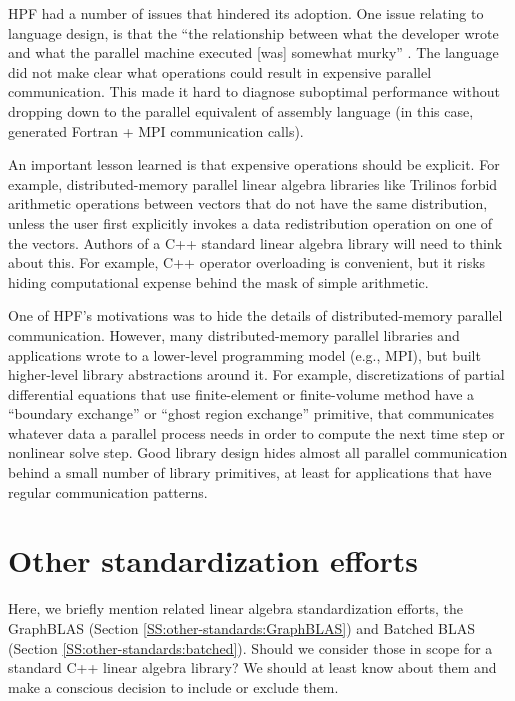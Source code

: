 HPF had a number of issues that hindered its adoption.  One issue
relating to language design, is that the ``the relationship between
what the developer wrote and what the parallel machine executed [was]
somewhat murky'' \cite[p. 13]{Kennedy2007}.  The language did not make
clear what operations could result in expensive parallel
communication.  This made it hard to diagnose suboptimal performance
without dropping down to the parallel equivalent of assembly language
(in this case, generated Fortran + MPI communication calls).

An important lesson learned is that expensive operations should be
explicit.  For example, distributed-memory parallel linear algebra
libraries like Trilinos \cite{heroux2005trilinos} forbid arithmetic
operations between vectors that do not have the same distribution,
unless the user first explicitly invokes a data redistribution
operation on one of the vectors.  Authors of a C++ standard linear
algebra library will need to think about this.  For example, C++
operator overloading is convenient, but it risks hiding computational
expense behind the mask of simple arithmetic.

One of HPF's motivations was to hide the details of distributed-memory
parallel communication.  However, many distributed-memory parallel
libraries and applications wrote to a lower-level programming model
(e.g., MPI), but built higher-level library abstractions around it.
For example, discretizations of partial differential equations that
use finite-element or finite-volume method have a ``boundary
exchange'' or ``ghost region exchange'' primitive, that communicates
whatever data a parallel process needs in order to compute the next
time step or nonlinear solve step.  Good library design hides almost
all parallel communication behind a small number of library
primitives, at least for applications that have regular communication
patterns.

\section{Other standardization efforts}
\label{S:other-standards}

Here, we briefly mention related linear algebra standardization
efforts, the GraphBLAS (Section \ref{SS:other-standards:GraphBLAS})
and Batched BLAS (Section \ref{SS:other-standards:batched}).  Should
we consider those in scope for a standard C++ linear algebra library?
We should at least know about them and make a conscious decision to
include or exclude them.

